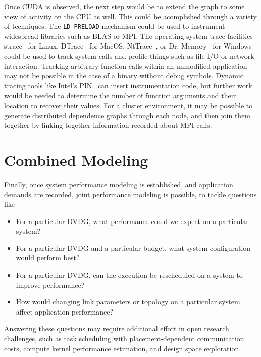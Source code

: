 Once CUDA is observed, the next step would be to extend the graph to some view of activity on the CPU as well.
This could be acomplished through a variety of techniques.
The \texttt{LD\_PRELOAD} mechanism could be used to instrument widespread libraries such as BLAS or MPI.
The operating system trace facilities strace~\cite{strace2018} for Linux, DTrace~\cite{dtrace2008} for MacOS, NtTrace~\cite{orr2014nttrace}, or Dr. Memory~\cite{bruening2001design}\cite{drmemory2018} for Windows could be used to track system calls and profile things such as file I/O or network interaction.
Tracking arbitrary function calls within an unmodified application may not be possible in the case of a binary without debug symbols.
Dynamic tracing tools like Intel's PIN~\cite{intel2012pin} can insert instrumentation code, but further work would be needed to determine the number of function arguments and their location to recover their values.
For a cluster environment, it may be possible to generate distributed dependence graphs through each node, and then join them together by linking together information recorded about MPI calls.

\section{Combined Modeling}
\label{sec:modeling}

Finally, once system performance modeling is established, and application demands are recorded, joint performance modeling is possible, to tackle questions like
\begin{itemize}
    \item For a particular DVDG, what performance could we expect on a particular system?
    \item For a particular DVDG and a particular budget, what system configuration would perform best?
    \item For a particular DVDG, can the execution be rescheduled on a system to improve performance?
    \item How would changing link parameters or topology on a particular system affect application performance?
\end{itemize}
Answering these questions may require additional effort in open research challenges, such as task scheduling with placement-dependent communication costs, compute kernel performance estimation, and design space exploration.
